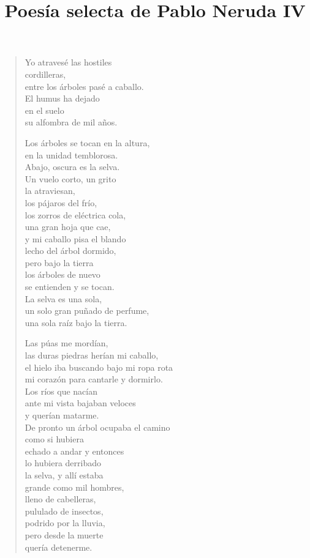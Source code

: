 \documentclass[12pt]{article}
\date{}
\title{Poesía selecta de Pablo Neruda IV}
\begin{document}
\maketitle
\tableofcontents
\clearpage
{}
\begin{verse}

Yo atravesé las hostiles\\
cordilleras,\\
entre los árboles pasé a caballo.\\
El humus ha dejado\\
en el suelo\\
su alfombra de mil años.  

Los árboles se tocan en la altura,\\
en la unidad temblorosa.\\
Abajo, oscura es la selva.\\
Un vuelo corto, un grito\\
la atraviesan,\\
los pájaros del frío,\\
los zorros de eléctrica cola,\\
una gran hoja que cae,\\
y mi caballo pisa el blando\\
lecho del árbol dormido,\\
pero bajo la tierra\\
los árboles de nuevo\\
se entienden y se tocan.\\
La selva es una sola,\\
un solo gran puñado de perfume,\\
una sola raíz bajo la tierra.  

Las púas me mordían,\\
las duras piedras herían mi caballo,\\
el hielo iba buscando bajo mi ropa rota\\
mi corazón para cantarle y dormirlo.\\
Los ríos que nacían\\
ante mi vista bajaban veloces\\
y querían matarme.\\
De pronto un árbol ocupaba el camino\\
como si hubiera\\
echado a andar y entonces\\
lo hubiera derribado\\
la selva, y allí estaba\\
grande como mil hombres,\\
lleno de cabelleras,\\
pululado de insectos,\\
podrido por la lluvia,\\
pero desde la muerte\\
quería detenerme.  


\end{verse}
\end{document}
